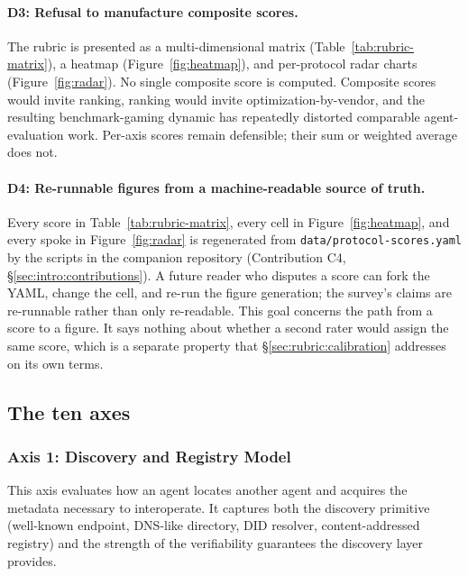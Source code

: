 \paragraph{D3: Refusal to manufacture composite scores.}
The rubric is presented as a multi-dimensional matrix
(Table~\ref{tab:rubric-matrix}), a heatmap
(Figure~\ref{fig:heatmap}), and per-protocol radar charts
(Figure~\ref{fig:radar}). No single composite score is
computed. Composite scores would invite ranking, ranking
would invite optimization-by-vendor, and the resulting
benchmark-gaming dynamic has repeatedly distorted
comparable agent-evaluation work. Per-axis scores remain
defensible; their sum or weighted average does not.

\paragraph{D4: Re-runnable figures from a machine-readable
source of truth.} Every score in Table~\ref{tab:rubric-matrix},
every cell in Figure~\ref{fig:heatmap}, and every spoke in
Figure~\ref{fig:radar} is regenerated from
\texttt{data/protocol-scores.yaml} by the scripts in the
companion repository (Contribution C4,
\S\ref{sec:intro:contributions}). A future reader who
disputes a score can fork the YAML, change the cell, and
re-run the figure generation; the survey's claims are
re-runnable rather than only re-readable. This goal
concerns the path from a score to a figure. It says nothing
about whether a second rater would assign the same score,
which is a separate property that
\S\ref{sec:rubric:calibration} addresses on its own terms.

\subsection{The ten axes}
\label{sec:rubric:axes}

\subsubsection{Axis 1: Discovery and Registry Model}
\label{sec:rubric:axis1}

This axis evaluates how an agent locates another agent and
acquires the metadata necessary to interoperate. It captures
both the discovery primitive (well-known endpoint, DNS-like
directory, DID resolver, content-addressed registry) and the
strength of the verifiability guarantees the discovery layer
provides.

